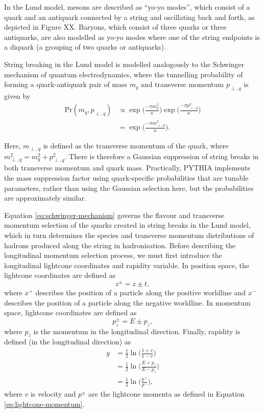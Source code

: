 \documentclass[12pt,a4paper]{report}
\begin{document}
In the Lund model, mesons are described as ``yo-yo modes'', which consist of a quark and an antiquark connected by a string and oscillating back and forth, as depicted in Figure XX. Baryons, which consist of three quarks or three antiquarks, are also modelled as yo-yo modes where one of the string endpoints is a diquark (a grouping of two quarks or antiquarks).

String breaking in the Lund model is modelled analogously to the Schwinger mechanism of quantum electrodynamics, where the tunnelling probability of forming a quark-antiquark pair of mass $m_q$ and transverse momentum $p_{\perp,q}$ is given by
\begin{align}\label{eq:schwinger-mechanism}
  \text{Pr}(m_q, p_{\perp,q}) &\propto \exp\Bigr(\frac{-\pi m_q^2}{\kappa}\Bigr) \exp\Bigr(\frac{-\pi p_{\perp,q}^2}{\kappa}\Bigr) \nonumber \\
  &= \exp \Bigr(\frac{-\pi m_{\perp,q}^2}{\kappa}\Bigr).
\end{align}

Here, $m_{\perp,q}$ is defined as the transverse momentum of the quark, where $m_{\perp,q}^2 = m_q^2 + p_{\perp,q}^2$. There is therefore a Gaussian suppression of string breaks in both transverse momentum and quark mass. Practically, PYTHIA implements the mass suppression factor using quark-specific probabilities that are tunable parameters, rather than using the Gaussian selection here, but the probabilities are approximately similar.

Equation \eqref{eq:schwinger-mechanism} governs the flavour and transverse momentum selection of the quarks created in string breaks in the Lund model, which in turn determines the species and transverse momentum distributions of hadrons produced along the string in hadronisation. Before describing the longitudinal momentum selection process, we must first introduce the longitudinal lightcone coordinates and rapidity variable. In position space, the lightcone coordinates are defined as
\begin{equation}
  z^\pm = z \pm t,
\end{equation}
where $x^+$ describes the position of a particle along the positive worldline and $x^-$ describes the position of a particle along the negative worldline. In momentum space, lightcone coordinates are defined as
\begin{equation}\label{eq:lightcone-momentum}
  p_z^\pm = E \pm p_z,
\end{equation}
where $p_z$ is the momentum in the longitudinal direction. Finally, rapidity is defined (in the longitudinal direction) as
\begin{align}
  y &= \frac{1}{2} \ln \Bigr( \frac{1+v}{1-v}\Bigr)  \nonumber \\
    &= \frac{1}{2} \ln \Bigr( \frac{E + p_z}{E - p_z} \Bigr) \nonumber \\
  &= \frac{1}{2} \ln \Bigr(\frac{p^+}{p^-}\Bigr),
\end{align}
where $v$ is velocity and $p^\pm$ are the lightcone momenta as defined in Equation \eqref{eq:lightcone-momentum}. 
\end{document}
